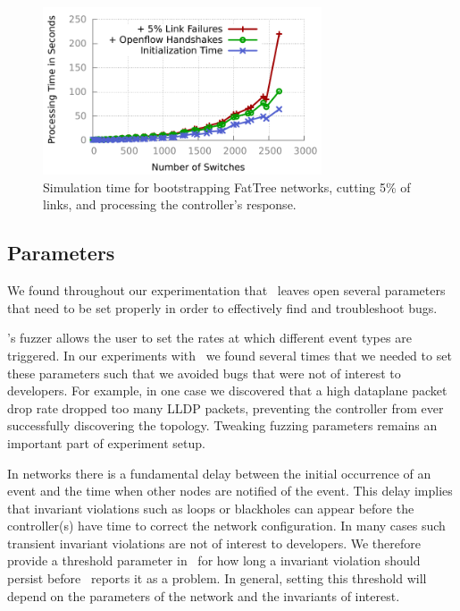 \begin{figure}[t]
    \includegraphics[width=3.25in]{../graphs/scalability/scaling.pdf}
    \caption[]{\label{fig:scaling} Simulation time for bootstrapping FatTree
    networks, cutting 5\% of links, and processing the controller's response.}
\end{figure}

\subsection{Parameters}
\label{subsec:params}

We found throughout our experimentation that \projectname~leaves open several
parameters that need to be set properly in order to effectively find and troubleshoot bugs.

 \projectname's fuzzer allows the
user to set the rates at which different event types are triggered. In our experiments with
\projectname~we found several times that we needed to set these parameters
such that we avoided bugs that were not of interest to developers.
For example, in one case we discovered that a high dataplane
packet drop rate dropped too many LLDP packets, preventing the controller from ever successfully discovering the topology.
Tweaking fuzzing parameters remains an important
part of experiment setup.

 In
networks there is a fundamental delay between the initial occurrence of an
event and the time when other nodes are notified of the event. This delay implies
that invariant violations such as loops or blackholes can appear
before the controller(s) have time to correct the network configuration. In
many cases such transient invariant violations are not of interest to
developers. We therefore provide a threshold parameter in \projectname~for
how long a invariant violation should persist before
\projectname~reports it as a problem. In general, setting this
threshold will depend on the parameters of the network and the invariants of
interest.


